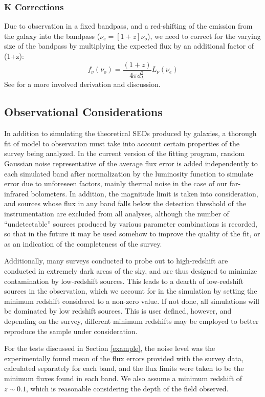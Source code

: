 \documentclass[twocolumn,letterpaper,10pt]{article}
\begin{document}
\subsubsection{K Corrections}

Due to observation in a fixed bandpass, and a red-shifting of the emission from the galaxy into the bandpass ($\nu_e=[1+z]\nu_o$), we need to correct for the varying size of the bandpass by multiplying the expected flux by an additional factor of (1+z):
$$
f_{\nu}(\nu_o)=\frac{(1+z)}{4\pi d_L^2}L_{\nu}(\nu_e)
$$
See \citet{Hogg02} for a more involved derivation and discussion.

\subsection{Observational Considerations}\label{sec:obs}

In addition to simulating the theoretical SEDs produced by galaxies, a thorough fit of model to observation must take into account certain properties of the survey being analyzed. In the current version of the fitting program, random Gaussian noise representative of the average flux error is added independently to each simulated band after normalization by the luminosity function to simulate error due to unforeseen factors, mainly thermal noise in the case of our far-infrared bolometers. In addition, the magnitude limit is taken into consideration, and sources whose flux in any band falls below the detection threshold of the instrumentation are excluded from all analyses, although the number of ``undetectable'' sources produced by various parameter combinations is recorded, so that in the future it may be used somehow to improve the quality of the fit, or as an indication of the completeness of the survey.

Additionally, many surveys conducted to probe out to high-redshift are conducted in extremely dark areas of the sky, and are thus designed to minimize contamination by low-redshift sources. This leads to a dearth of low-redshift sources in the observation, which we account for in the simulation by setting the minimum redshift considered to a non-zero value. If not done, all simulations will be dominated by low redshift sources. This is user defined, however, and depending on the survey, different minimum redshifts may be employed to better reproduce the sample under consideration.

For the tests discussed in Section \ref{example}, the noise level was the experimentally found mean of the flux errors provided with the survey data, calculated separately for each band, and the flux limits were taken to be the minimum fluxes found in each band. We also assume a minimum redshift of $z\sim 0.1$, which is reasonable considering the depth of the field observed.
\end{document}
